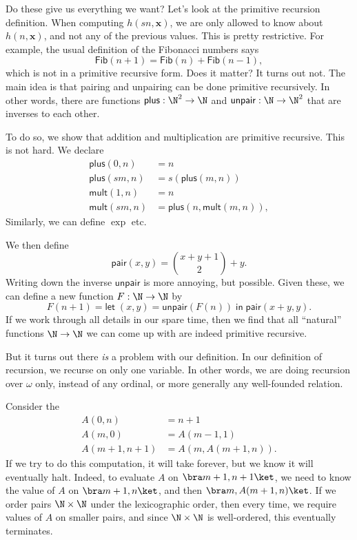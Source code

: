 \documentclass[a4paper]{article}
\newcommand\pair{\mathsf{pair}}
\newcommand\unpair{\mathsf{unpair}}
\newcommand\plus{\mathsf{plus}}
\newcommand\mult{\mathsf{mult}}
\newcommand\clet{\mathsf{let}\;}
\newcommand\cin{\;\mathsf{in}\;}
\begin{document}
Do these give us everything we want? Let's look at the primitive recursion definition. When computing $h(sn, \mathbf{x})$, we are only allowed to know about $h(n, \mathbf{x})$, and not any of the previous values. This is pretty restrictive. For example, the usual definition of the Fibonacci numbers says
\[
  \mathsf{Fib}(n + 1) = \mathsf{Fib}(n) + \mathsf{Fib}(n - 1),
\]
which is not in a primitive recursive form. Does it matter? It turns out not. The main idea is that pairing and unpairing can be done primitive recursively. In other words, there are functions $\plus: \N^2 \to \N$ and $\unpair: \N \to \N^2$ that are inverses to each other.

To do so, we show that addition and multiplication are primitive recursive. This is not hard. We declare
\begin{align*}
  \plus(0, n) &= n\\
  \plus(sm, n) &= s(\plus(m, n))\\
  \mult(1, n) &= n\\
  \mult(sm, n) &= \plus(n, \mult(m, n)),
\end{align*}
Similarly, we can define $\exp$ etc.

We then define
\[
  \pair(x, y) = \binom{x + y + 1}{2} + y.
\]
Writing down the inverse $\unpair$ is more annoying, but possible. Given these, we can define a new function $F: \N \to \N$ by
\[
  F(n + 1) = \clet (x, y) = \unpair (F(n)) \cin \pair(x + y, y).
\]
If we work through all details in our spare time, then we find that all ``natural'' functions $\N \to \N$ we can come up with are indeed primitive recursive.

But it turns out there \emph{is} a problem with our definition. In our definition of recursion, we recurse on only one variable. In other words, we are doing recursion over $\omega$ only, instead of any ordinal, or more generally any well-founded relation.

Consider the 
\begin{align*}
  A(0, n) &= n + 1\\
  A(m, 0) &= A(m -1, 1)\\
  A(m + 1, n + 1) &= A(m, A(m + 1, n)).
\end{align*}
If we try to do this computation, it will take forever, but we know it will eventually halt. Indeed, to evaluate $A$ on $\bra m + 1, n + 1\ket$, we need to know the value of $A$ on $\bra m + 1, n\ket$, and then $\bra m, A(m + 1, n)\ket$. If we order pairs $\N \times \N$ under the lexicographic order, then every time, we require values of $A$ on smaller pairs, and since $\N \times \N$ is well-ordered, this eventually terminates.
\end{document}
